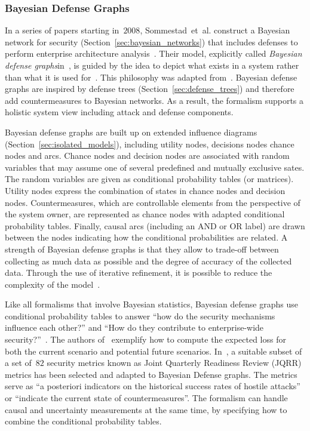 \documentclass[a4paper]{article}
\begin{document}
\subsubsection{Bayesian Defense Graphs} 
\label{sec:bayesian_defense_graphs}

In a series of papers starting in~$2008$, Sommestad~et~al. construct a Bayesian
network for security (Section~\ref{sec:bayesian_networks}) that includes
defenses to perform enterprise architecture
analysis~\cite{FrSoEkJo,SoEkJo4,SoEkJo2,EkSo,SoEkNo}. Their model, explicitly
called \emph{Bayesian defense graphs}in~\cite{SoEkJo2}, is guided by the idea to
depict what exists in a system rather than what it is used for~\cite{SoEkJo2}.
This philosophy was adapted from~\cite{JoJoSoUl}. Bayesian defense graphs are
inspired by defense trees (Section~\ref{sec:defense_trees}) and therefore add
countermeasures to Bayesian networks. As a result, the formalism supports a
holistic system view including attack and defense components.

Bayesian defense graphs are built up on extended influence diagrams
(Section~\ref{sec:isolated_models}), including utility nodes, decisions nodes
chance nodes and arcs. Chance nodes and decision nodes are associated with
random variables that may assume one of several predefined and mutually
exclusive sates. The random variables are given as conditional probability
tables (or matrices). Utility nodes express the combination of states in chance
nodes and decision nodes. Countermeasures, which are controllable elements from
the perspective of the system owner, are represented as chance nodes with
adapted conditional probability tables. Finally, causal arcs (including an AND
or OR label) are drawn between the nodes indicating how the conditional
probabilities are related. A strength of Bayesian defense graphs is that they
allow to trade-off between collecting as much data as possible and the degree of
accuracy of the collected data. Through the use of iterative refinement, it is
possible to reduce the complexity of the model~\cite{SoEkJo2}. 

Like all formalisms that involve Bayesian statistics, Bayesian defense graphs 
use conditional probability tables to answer ``how do the security mechanisms
influence each other?'' and ``How do they contribute to enterprise-wide
security?''~\cite{SoEkJo4}. The authors of~\cite{SoEkJo4} exemplify how to 
compute the expected loss for both the current scenario and potential future 
scenarios. In~\cite{FrSoEkJo}, a suitable subset of a set of~$82$ security 
metrics known as Joint Quarterly Readiness Review (JQRR) metrics has been 
selected and adapted to Bayesian Defense graphs. The metrics serve as ``a 
posteriori indicators on the historical success rates of hostile attacks'' or 
``indicate the current state of countermeasures''. The formalism can handle 
causal and uncertainty measurements at the same time, by specifying how to 
combine the conditional probability tables.
\end{document}
